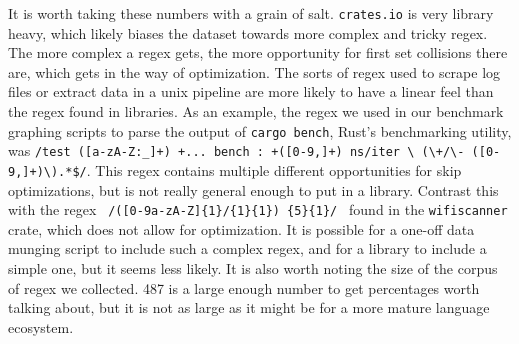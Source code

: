 It is worth taking these numbers with a grain of salt. \verb'crates.io'
is very library heavy, which likely biases the dataset towards
more complex and tricky regex. The more complex a regex gets,
the more opportunity for first set collisions there are, which gets
in the way of optimization. The sorts
of regex used to scrape log files or extract data in a unix pipeline
are more likely to have a linear feel than the regex found in
libraries. As an example, the regex we used in our
benchmark graphing scripts to parse the output
of \texttt{cargo \allowbreak bench}, Rust's benchmarking utility, was
\texttt{/test \allowbreak([a-zA-Z:\_]+) \allowbreak +... bench\allowbreak
      : \allowbreak+([0-9,]+) \allowbreak ns/iter \textbackslash
      (\textbackslash+/\textbackslash- \allowbreak
      ([0-9,]+)\textbackslash).*\$/}.
This regex contains multiple different opportunities for skip optimizations,
but is not really general enough to put in a library. Contrast this
with the regex
\texttt{
/([0-9a-zA-Z]\allowbreak\{1\}\allowbreak/\allowbreak
[0-9a-zA-Z]\{1\}\allowbreak[:]\allowbreak\{1\})
\{5\}\allowbreak[0-9a-zA-Z]\allowbreak[0-9a-zA-Z]
\allowbreak\{1\}/
}
found in the \verb'wifiscanner' crate, which does not allow for
optimization. It is possible for a one-off data munging script to include
such a complex regex, and for a library to include a simple one, but
it seems less likely. It is also worth noting the size of the corpus of
regex we collected. 487 is a large enough number to get 
percentages worth talking about, but it is not as large as it might
be for a more mature language ecosystem.

